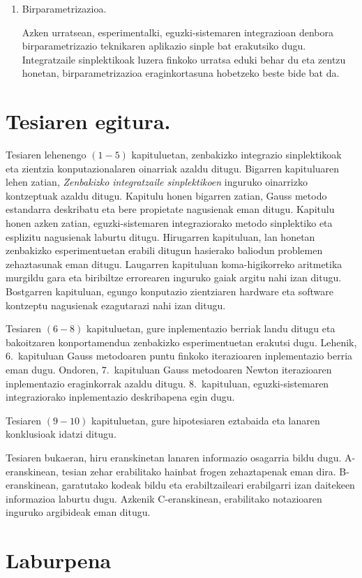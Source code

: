\begin{enumerate}
\item Birparametrizazioa.

Azken urratsean, esperimentalki, eguzki-sistemaren integrazioan  denbora birparametrizazio teknikaren aplikazio sinple bat erakutsiko dugu. Integratzaile sinplektikoak luzera finkoko urratsa eduki behar du eta zentzu honetan, birparametrizazioa eraginkortasuna hobetzeko beste bide bat da.      

\end{enumerate}        


\section{Tesiaren egitura.}

Tesiaren lehenengo $(1-5)$ kapituluetan, zenbakizko integrazio sinplektikoak eta zientzia konputazionalaren oinarriak azaldu ditugu. Bigarren kapituluaren lehen zatian, \emph{Zenbakizko integratzaile sinplektikoen} inguruko oinarrizko kontzeptuak azaldu ditugu. Kapitulu honen bigarren zatian, Gauss metodo estandarra deskribatu eta bere propietate nagusienak eman ditugu. Kapitulu honen azken zatian, eguzki-sistemaren integraziorako metodo sinplektiko eta esplizitu nagusienak laburtu ditugu. Hirugarren kapituluan, lan honetan zenbakizko esperimentuetan erabili ditugun hasierako baliodun problemen zehaztasunak eman ditugu. Laugarren kapituluan koma-higikorreko aritmetika murgildu gara eta biribiltze errorearen inguruko gaiak argitu nahi izan ditugu. Bostgarren kapituluan, egungo konputazio zientziaren hardware eta software kontzeptu nagusienak ezagutarazi nahi izan ditugu.     

Tesiaren $(6-8)$ kapituluetan, gure inplementazio berriak landu ditugu eta bakoitzaren konportamendua zenbakizko esperimentuetan erakutsi dugu. Lehenik, $6$.~kapituluan Gauss metodoaren puntu finkoko iterazioaren inplementazio berria eman dugu. Ondoren, $7$.~kapituluan Gauss metodoaren Newton iterazioaren inplementazio eraginkorrak azaldu ditugu. $8$.~kapituluan, eguzki-sistemaren integraziorako inplementazio deskribapena egin dugu.  

Tesiaren $(9-10)$ kapituluetan, gure hipotesiaren eztabaida eta lanaren konklusioak idatzi ditugu.

Tesiaren bukaeran, hiru eranskinetan lanaren informazio osagarria bildu dugu. A-eranskinean, tesian zehar erabilitako hainbat frogen zehaztapenak eman dira. B-eranskinean, garatutako kodeak bildu eta erabiltzaileari erabilgarri izan daitekeen informazioa laburtu dugu. Azkenik C-eranskinean, erabilitako notazioaren inguruko argibideak eman ditugu.

      
      
\section{Laburpena}

